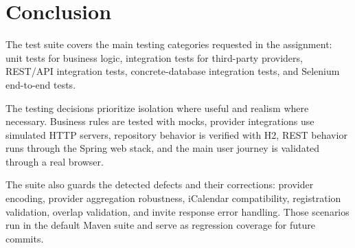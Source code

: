 \chapter{Conclusion} \label{cap:conclusion}

The test suite covers the main testing categories requested in the assignment: unit tests for business logic, integration tests for third-party providers, REST/API integration tests, concrete-database integration tests, and Selenium end-to-end tests.

The testing decisions prioritize isolation where useful and realism where necessary. Business rules are tested with mocks, provider integrations use simulated HTTP servers, repository behavior is verified with H2, REST behavior runs through the Spring web stack, and the main user journey is validated through a real browser.

The suite also guards the detected defects and their corrections: provider encoding, provider aggregation robustness, iCalendar compatibility, registration validation, overlap validation, and invite response error handling. Those scenarios run in the default Maven suite and serve as regression coverage for future commits.
